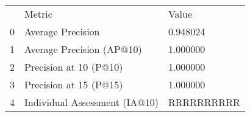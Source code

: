 \begin{tabular}{lll}
 & Metric & Value \\
0 & Average Precision & 0.948024 \\
1 & Average Precision (AP@10) & 1.000000 \\
2 & Precision at 10 (P@10) & 1.000000 \\
3 & Precision at 15 (P@15) & 1.000000 \\
4 & Individual Assessment (IA@10) & RRRRRRRRRR \\
\end{tabular}
